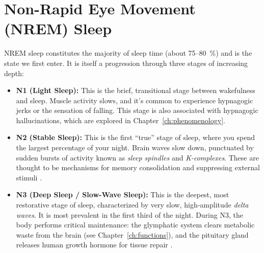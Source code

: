\section{Non-Rapid Eye Movement (NREM) Sleep}\label{sec:nrem}

NREM sleep constitutes the majority of sleep time (about 75--80~\%) and is the state we first enter. It is itself a progression through three stages of increasing depth:

\begin{itemize}
    \item \textbf{N1 (Light Sleep):} This is the brief, transitional stage between wakefulness and sleep. Muscle activity slows, and it's common to experience hypnagogic jerks or the sensation of falling. This stage is also associated with hypnagogic hallucinations, which are explored in Chapter~\ref{ch:phenomenology}.
    
    \item \textbf{N2 (Stable Sleep):} This is the first ``true'' stage of sleep, where you spend the largest percentage of your night. Brain waves slow down, punctuated by sudden bursts of activity known as \textit{sleep spindles} and \textit{K-complexes}. These are thought to be mechanisms for memory consolidation and suppressing external stimuli \citep{fuller2006}.
    
    \item \textbf{N3 (Deep Sleep / Slow-Wave Sleep):} This is the deepest, most restorative stage of sleep, characterized by very slow, high-amplitude \textit{delta waves}. It is most prevalent in the first third of the night. During N3, the body performs critical maintenance: the glymphatic system clears metabolic waste from the brain (see Chapter~\ref{ch:functions}), and the pituitary gland releases human growth hormone for tissue repair \citep{benington1999}.
\end{itemize}
